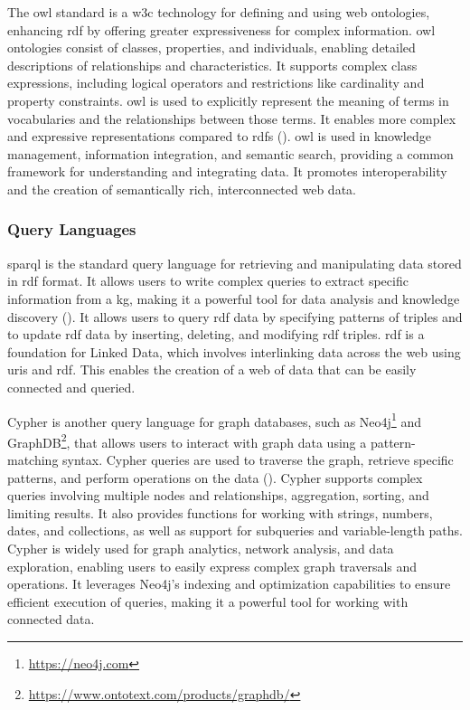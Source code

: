 The \gls{owl} standard is a \gls{w3c} technology for defining and using web ontologies, enhancing \gls{rdf} by offering greater expressiveness for complex information. \gls{owl} ontologies consist of classes, properties, and individuals, enabling detailed descriptions of relationships and characteristics. It supports complex class expressions, including logical operators and restrictions like cardinality and property constraints.
\gls{owl} is used to explicitly represent the meaning of terms in vocabularies and the relationships between those terms. It enables more complex and expressive representations compared to \gls{rdfs} (\cite{Deborah2004}).
\gls{owl} is used in knowledge management, information integration, and semantic search, providing a common framework for understanding and integrating data. It promotes interoperability and the creation of semantically rich, interconnected web data.

\subsubsection*{Query Languages}
\gls{sparql} is the standard query language for retrieving and manipulating data stored in \gls{rdf} format. It allows users to write complex queries to extract specific information from a \gls{kg}, making it a powerful tool for data analysis and knowledge discovery (\cite{Jorge2009}).
It allows users to query \gls{rdf} data by specifying patterns of triples and to update \gls{rdf} data by inserting, deleting, and modifying \gls{rdf} triples. \gls{rdf} is a foundation for Linked Data, which involves interlinking data across the web using \glspl{uri} and \gls{rdf}. This enables the creation of a web of data that can be easily connected and queried.

Cypher is another query language for graph databases, such as Neo4j\footnote{\url{https://neo4j.com}} and GraphDB\footnote{\url{https://www.ontotext.com/products/graphdb/}}, that allows users to interact with graph data using a pattern-matching syntax. Cypher queries are used to traverse the graph, retrieve specific patterns, and perform operations on the data (\cite{Francis2018}).
Cypher supports complex queries involving multiple nodes and relationships, aggregation, sorting, and limiting results. It also provides functions for working with strings, numbers, dates, and collections, as well as support for subqueries and variable-length paths.
Cypher is widely used for graph analytics, network analysis, and data exploration, enabling users to easily express complex graph traversals and operations. It leverages Neo4j's indexing and optimization capabilities to ensure efficient execution of queries, making it a powerful tool for working with connected data.

